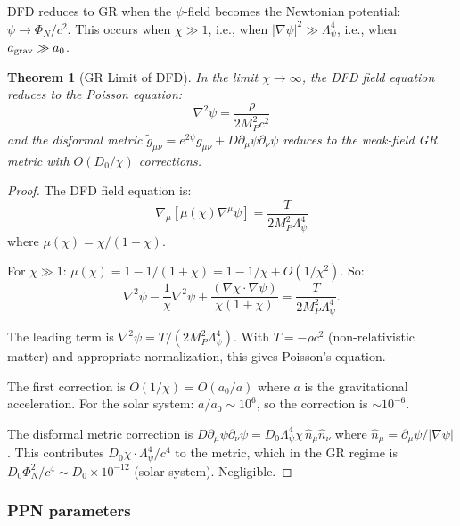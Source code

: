\documentclass[11pt,a4paper]{article}
\newtheorem{theorem}{Theorem}
\begin{document}
DFD reduces to GR when the $\psi$-field becomes the Newtonian potential: $\psi \to \Phi_N/c^2$. This occurs when $\chi \gg 1$, i.e., when $|\nabla\psi|^2 \gg \Lambda_\psi^4$, i.e., when $a_{\rm grav} \gg a_0$.

\begin{theorem}[GR Limit of DFD]
In the limit $\chi \to \infty$, the DFD field equation reduces to the Poisson equation:
\begin{equation}
\nabla^2\psi = \frac{\rho}{2M_P^2 c^2}
\end{equation}
and the disformal metric $\tilde{g}_{\mu\nu} = e^{2\psi}g_{\mu\nu} + D\partial_\mu\psi\partial_\nu\psi$ reduces to the weak-field GR metric with $O(D_0/\chi)$ corrections.
\end{theorem}

\begin{proof}
The DFD field equation is:
\begin{equation}
\nabla_\mu\left[\mu(\chi)\nabla^\mu\psi\right] = \frac{T}{2M_P^2\Lambda_\psi^4}
\end{equation}
where $\mu(\chi) = \chi/(1+\chi)$.

For $\chi \gg 1$: $\mu(\chi) = 1 - 1/(1+\chi) = 1 - 1/\chi + O(1/\chi^2)$. So:
\begin{equation}
\nabla^2\psi - \frac{1}{\chi}\nabla^2\psi + \frac{(\nabla\chi \cdot \nabla\psi)}{\chi(1+\chi)} = \frac{T}{2M_P^2\Lambda_\psi^4}.
\end{equation}

The leading term is $\nabla^2\psi = T/(2M_P^2\Lambda_\psi^4)$. With $T = -\rho c^2$ (non-relativistic matter) and appropriate normalization, this gives Poisson's equation.

The first correction is $O(1/\chi) = O(a_0/a)$ where $a$ is the gravitational acceleration. For the solar system: $a/a_0 \sim 10^6$, so the correction is $\sim 10^{-6}$.

The disformal metric correction is $D\partial_\mu\psi\partial_\nu\psi = D_0\Lambda_\psi^4\chi\,\hat{n}_\mu\hat{n}_\nu$ where $\hat{n}_\mu = \partial_\mu\psi/|\nabla\psi|$. This contributes $D_0\chi \cdot \Lambda_\psi^4/c^4$ to the metric, which in the GR regime is $D_0\Phi_N^2/c^4 \sim D_0 \times 10^{-12}$ (solar system). Negligible.
\end{proof}

\subsubsection{PPN parameters}
\end{document}
